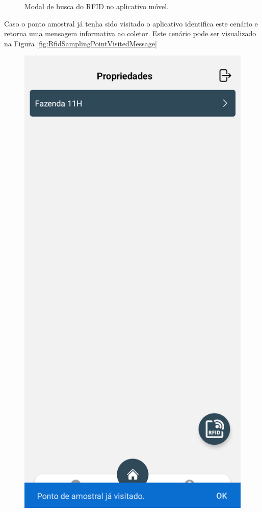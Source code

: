 \begin{figure}[htb]
\begin{minipage}[b]{0.30\textwidth}
    \end{minipage}
    \caption{Modal de busca do RFID no aplicativo móvel.}
    \label{fig:RfidModal}
\end{figure}

Caso o ponto amostral já tenha sido visitado o aplicativo identifica este cenário e retorna uma mensagem informativa ao coletor. Este cenário pode ser visualizado na Figura \ref{fig:RfidSamplingPointVisitedMessage}

\begin{figure}[H]
    \centering
    \begin{minipage}[b]{0.30\textwidth}
        \centering
        \includegraphics[width=\textwidth]{images/app/check-rfid-sp-visited.png}

\end{minipage}
\end{figure}
